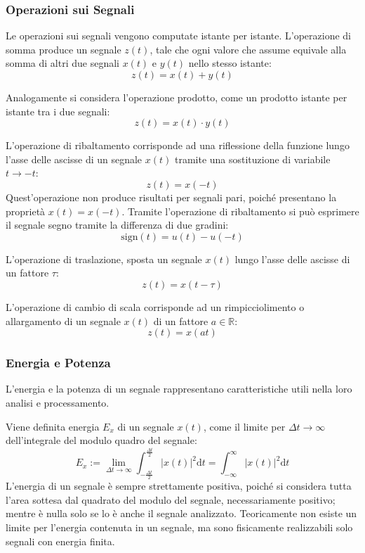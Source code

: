 \documentclass{article}
\newcommand{\df}{\mathrm{d}}
\numberwithin{equation}{subsection}
\begin{document}
\subsubsection{Operazioni sui Segnali}

Le operazioni sui segnali vengono computate istante per istante. L'operazione di somma produce un segnale $z(t)$, tale che ogni valore che assume equivale alla somma 
di altri due segnali $x(t)$ e $y(t)$ nello stesso istante:
\begin{equation*}
    z(t)=x(t)+y(t)
\end{equation*}

Analogamente si considera l'operazione prodotto, come un prodotto istante per istante tra i due segnali:
\begin{equation*}
    z(t)=x(t)\cdot y(t)
\end{equation*}

L'operazione di ribaltamento corrisponde ad una riflessione della funzione lungo l'asse delle ascisse di un segnale $x(t)$ tramite una sostituzione di variabile $t\to-t$:
\begin{equation*}
    z(t)=x(-t)
\end{equation*}
Quest'operazione non produce risultati per segnali pari, poiché presentano la proprietà $x(t)=x(-t)$. 
Tramite l'operazione di ribaltamento si può esprimere il segnale segno tramite la differenza di due gradini:
\begin{equation*}
    \mbox{sign}(t)=u(t)-u(-t)
\end{equation*}


L'operazione di traslazione, sposta un segnale $x(t)$ lungo l'asse delle ascisse di un fattore $\tau$:
\begin{equation*}
    z(t)=x(t-\tau)
\end{equation*}

L'operazione di cambio di scala corrisponde ad un rimpicciolimento o allargamento di un segnale $x(t)$ di un fattore $a\in\mathbb{R}$:
\begin{equation*}
    z(t)=x(at)
\end{equation*}

\subsubsection{Energia e Potenza}

L'energia e la potenza di un segnale rappresentano caratteristiche utili nella loro analisi e processamento. 

Viene definita energia $E_x$ di un segnale $x(t)$, come il limite per $\Delta t\to\infty$ dell'integrale del modulo quadro del segnale: 
\begin{equation}
    E_x:=\lim_{\Delta t\to\infty}\displaystyle\int_{-\frac{\Delta t}{2}}^{\frac{\Delta t}{2}}|x(t)|^2\df t=\int_{-\infty}^{\infty}|x(t)|^2\df t
\end{equation}
L'energia di un segnale è sempre strettamente positiva, poiché si considera tutta l'area sottesa dal quadrato del modulo del segnale, necessariamente positivo; mentre è nulla 
solo se lo è anche il segnale analizzato. Teoricamente non esiste un limite per l'energia contenuta in un segnale, ma sono fisicamente realizzabili solo segnali con energia 
finita. 
\end{document}
